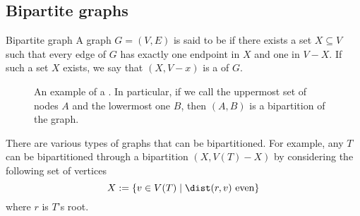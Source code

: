 \documentclass[a4paper, 12pt]{report}
\begin{document}
    \subsection{Bipartite graphs}

    \begin{frameddefn}{Bipartite graph}
        A graph $G = (V, E)$ is said to be  if there exists a set $X \subseteq V$ such that every edge of $G$ has exactly one endpoint in $X$ and one in $V - X$. If such a set $X$ exists, we say that $(X, V - x)$ is a  of $G$.
    \end{frameddefn}

    \begin{figure}[H]
        \centering
        \caption{An example of a . In particular, if we call the uppermost set of nodes $A$ and the lowermost one $B$, then $(A, B)$ is a bipartition of the graph.}
    \end{figure}

    There are various types of graphs that can be bipartitioned. For example, any  $T$ can be bipartitioned through a bipartition $(X, V(T) - X)$ by considering the following set of vertices $$X := \{v \in V(T) \mid \dist(r, v) \ \mathrm{even}\}$$ where $r$ is $T$'s root.
\end{document}
